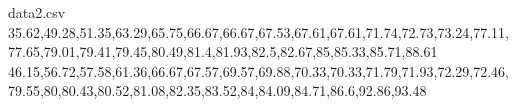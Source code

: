 
\begin{filecontents*}{data2.csv}
35.62,49.28,51.35,63.29,65.75,66.67,66.67,67.53,67.61,67.61,71.74,72.73,73.24,77.11,77.65,79.01,79.41,79.45,80.49,81.4,81.93,82.5,82.67,85,85.33,85.71,88.61
46.15,56.72,57.58,61.36,66.67,67.57,69.57,69.88,70.33,70.33,71.79,71.93,72.29,72.46,79.55,80,80.43,80.52,81.08,82.35,83.52,84,84.09,84.71,86.6,92.86,93.48
\end{filecontents*}

